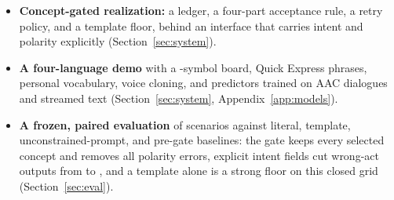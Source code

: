 \begin{itemize}
\item \textbf{Concept-gated realization:} a ledger, a four-part acceptance rule, a retry policy, and a template floor, behind an interface that carries intent and polarity explicitly (Section~\ref{sec:system}).
\item \textbf{A four-language demo} with a \NSymbols{}-symbol board, Quick Express phrases, personal vocabulary, voice cloning, and predictors trained on AAC dialogues and streamed text (Section~\ref{sec:system}, Appendix~\ref{app:models}).
\item \textbf{A frozen, paired evaluation} of \NPrimAll{} scenarios against literal, template, unconstrained-prompt, and pre-gate baselines: the gate keeps every selected concept and removes all polarity errors, explicit intent fields cut wrong-act outputs from \XDepUWrong{} to \XDepSWrong{}, and a template alone is a strong floor on this closed grid (Section~\ref{sec:eval}).
\end{itemize}
